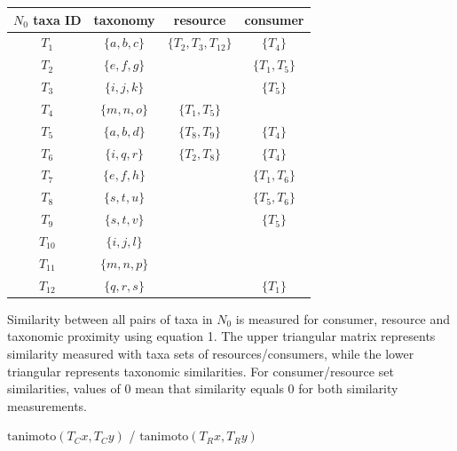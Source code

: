 \documentclass[letterpaper]{article}
\begin{document}
    \begin{table}[h!]
      \centering
      \begin{tabular}{cccc}
        \hline
        $N_0$ taxa ID & taxonomy &          resource &             consumer        \\
        \hline
        \hline
        $T_1$ &         $\{a, b, c\}$ &     $\{T_2, T_3, T_{12}\}$ &    $\{T_4\}$         \\
        $T_2$ &         $\{e, f, g\}$ &      &                          $\{T_1, T_5\}$    \\
        $T_3$ &         $\{i, j, k\}$ &      &                          $\{T_5\}$         \\
        $T_4$ &         $\{m, n, o\}$ &     $\{T_1, T_5\}$ &                              \\
        $T_5$ &         $\{a, b, d\}$ &     $\{T_8, T_9\}$ &            $\{T_4\}$         \\
        $T_6$ &         $\{i, q, r\}$ &     $\{T_2, T_8\}$ &            $\{T_4\}$         \\
        $T_7$ &         $\{e, f, h\}$ &      &                          $\{T_1, T_6\}$    \\
        $T_8$ &         $\{s, t, u\}$ &      &                          $\{T_5, T_6\}$    \\
        $T_9$ &         $\{s, t, v\}$ &      &                          $\{T_5\}$         \\
        $T_{10}$ &      $\{i, j, l\}$ &      &                                            \\
        $T_{11}$ &      $\{m, n, p\}$ &      &                                            \\
        $T_{12}$ &      $\{q, r, s\}$ &      &                          $\{T_1\}$         \\
        \hline
      \end{tabular}
    \end{table}

Similarity between all pairs of taxa in $N_0$ is measured for consumer, resource and taxonomic proximity using equation 1. The upper triangular matrix represents similarity measured with taxa sets of resources/consumers, while the lower triangular represents taxonomic similarities. For consumer/resource set similarities, values of 0 mean that similarity equals 0 for both similarity measurements.
\bigskip

    \centerline{$\mbox{tanimoto}(T_Cx, T_Cy)$ / $\mbox{tanimoto}(T_Rx, T_Ry)$ }
\end{document}
